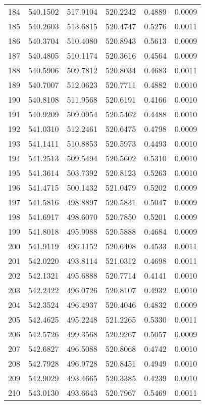 \documentclass{article}
\begin{document}
\begin{longtable}{|c|c|c|c|c|c|}
184 & 540.1502 & 517.9104 & 520.2242 & 0.4889 & 0.0009 \\
185 & 540.2603 & 513.6815 & 520.4747 & 0.5276 & 0.0011 \\
186 & 540.3704 & 510.4080 & 520.8943 & 0.5613 & 0.0009 \\
187 & 540.4805 & 510.1174 & 520.3616 & 0.4564 & 0.0009 \\
188 & 540.5906 & 509.7812 & 520.8034 & 0.4683 & 0.0011 \\
189 & 540.7007 & 512.0623 & 520.7711 & 0.4882 & 0.0010 \\
190 & 540.8108 & 511.9568 & 520.6191 & 0.4166 & 0.0010 \\
191 & 540.9209 & 509.0954 & 520.5462 & 0.4488 & 0.0010 \\
192 & 541.0310 & 512.2461 & 520.6475 & 0.4798 & 0.0009 \\
193 & 541.1411 & 510.8853 & 520.5973 & 0.4493 & 0.0010 \\
194 & 541.2513 & 509.5494 & 520.5602 & 0.5310 & 0.0010 \\
195 & 541.3614 & 503.7392 & 520.8123 & 0.5263 & 0.0010 \\
196 & 541.4715 & 500.1432 & 521.0479 & 0.5202 & 0.0009 \\
197 & 541.5816 & 498.8897 & 520.5831 & 0.5047 & 0.0009 \\
198 & 541.6917 & 498.6070 & 520.7850 & 0.5201 & 0.0009 \\
199 & 541.8018 & 495.9988 & 520.5888 & 0.4684 & 0.0009 \\
200 & 541.9119 & 496.1152 & 520.6408 & 0.4533 & 0.0011 \\
201 & 542.0220 & 493.8114 & 521.0312 & 0.4698 & 0.0011 \\
202 & 542.1321 & 495.6888 & 520.7714 & 0.4141 & 0.0010 \\
203 & 542.2422 & 496.0726 & 520.8107 & 0.4932 & 0.0010 \\
204 & 542.3524 & 496.4937 & 520.4046 & 0.4832 & 0.0009 \\
205 & 542.4625 & 495.2248 & 521.2265 & 0.5330 & 0.0011 \\
206 & 542.5726 & 499.3568 & 520.9267 & 0.5057 & 0.0009 \\
207 & 542.6827 & 496.5088 & 520.8068 & 0.4742 & 0.0010 \\
208 & 542.7928 & 496.9728 & 520.8451 & 0.4949 & 0.0010 \\
209 & 542.9029 & 493.4665 & 520.3385 & 0.4239 & 0.0010 \\
210 & 543.0130 & 493.6643 & 520.7967 & 0.5469 & 0.0011 \\

\end{longtable}
\end{document}
